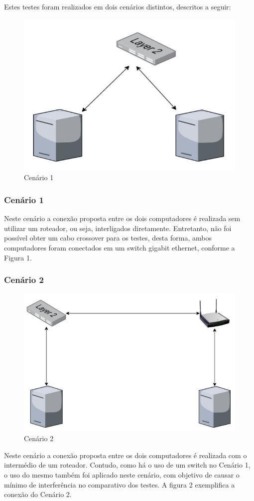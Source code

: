 \documentclass[12pt]{article}
\begin{document}
Estes testes foram realizados em dois cenários distintos, descritos a seguir:

\begin{figure}[ht]
\centering
\includegraphics[width=.5\textwidth]{fig_sem_roteador.png}
\caption{Cenário 1}
\label{fig:fig_sem_roteador}
\end{figure}

\subsubsection{Cenário 1}

Neste cenário a conexão proposta entre os dois computadores é realizada sem utilizar um roteador, ou seja, interligados diretamente. Entretanto, não foi possível obter um cabo crossover para os testes, desta forma, ambos computadores foram conectados em um switch gigabit ethernet, conforme a Figura 1.

\subsubsection{Cenário 2}

\begin{figure}[ht]
\centering
\includegraphics[width=.5\textwidth]{fig_com_roteador.png}
\caption{Cenário 2}
\label{fig:fig_com_roteador}
\end{figure}

Neste cenário a conexão proposta entre os dois computadores é realizada com o intermédio de um roteador. Contudo, como há o uso de um switch no Cenário 1, o uso do mesmo também foi aplicado neste cenário, com objetivo de causar o mínimo de interferência no comparativo dos testes.
A figura 2 exemplifica a conexão do Cenário 2.
\end{document}
